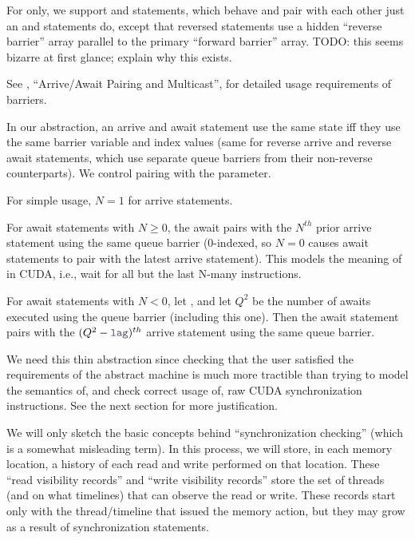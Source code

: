 \filbreak
For  only, we support  and  statements, which behave and pair with each other just an  and  statements do, except that reversed statements use a hidden ``reverse barrier'' array parallel to the primary ``forward barrier'' array.
TODO: this seems bizarre at first glance; explain why this exists.

\filbreak
See , ``Arrive/Await Pairing and Multicast'', for detailed usage requirements of barriers.

\filbreak
{} In our abstraction, an arrive and await statement use the same  state iff they use the same barrier variable and index values (same for reverse arrive and reverse await statements, which use separate queue barriers from their non-reverse counterparts).
We control pairing with the  parameter.

\filbreak
For simple usage, $N = 1$ for arrive statements.

\filbreak
For await statements with $N \ge 0$, the await pairs with the $N^{th}$ prior arrive statement using the same queue barrier
(0-indexed, so $N = 0$ causes await statements to pair with the latest arrive statement).
This models the meaning of  in CUDA, i.e., wait for all but the last N-many  instructions.

\filbreak
For await statements with $N < 0$, let , and let $Q^2$ be the number of awaits executed using the queue barrier (including this one).
Then the await statement pairs with the $(Q^2 - \lighttt{lag})^{th}$ arrive statement using the same queue barrier.

\filbreak
{} We need this thin abstraction since checking that the user satisfied the requirements of the abstract machine is much more tractible than trying to model the semantics of, and check correct usage of, raw CUDA synchronization instructions. See the next section for more justification.

\filbreak
{}

We will only sketch the basic concepts behind ``synchronization checking'' (which is a somewhat misleading term).
In this process, we will store, in each memory location, a history of each read and write performed on that location.
These ``read visibility records'' and ``write visibility records'' store the set of threads (and on what timelines) that can observe the read or write.
These records start only with the thread/timeline that issued the memory action, but they may grow as a result of synchronization statements.

